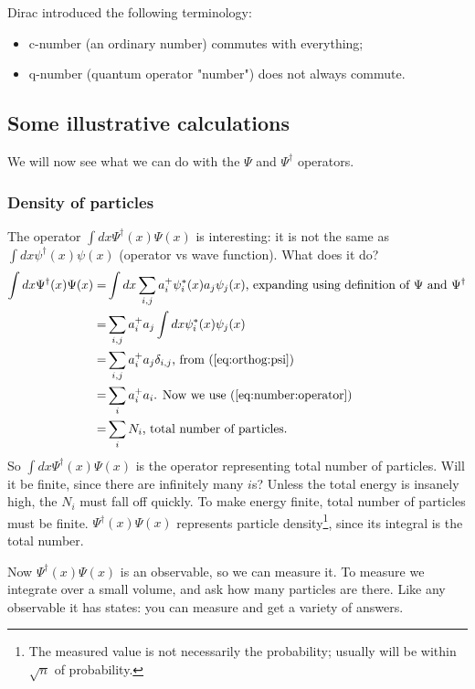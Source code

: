 \documentclass[]{article}
\begin{document}
Dirac introduced the following terminology:
\begin{itemize}
	\item c-number (an ordinary number) commutes with everything;
	\item q-number (quantum operator "number") does not always commute.
\end{itemize}

\subsection{Some illustrative calculations}
We will now see what we can do with the  $\Psi$ and  $\Psi^\dagger$ operators.

\subsubsection{Density of particles}

The operator $\int dx \Psi^\dagger(x) \Psi(x)$ is interesting: it is not the same as $\int dx \psi^\dagger(x) \psi(x)$ (operator vs wave function). What does it do?
\begin{align*}
	\int dx \Psi^\dagger(x) \Psi(x)=&\int dx \sum_{i,j}a^+_i\psi_i^*(x) a_j\psi_j(x) \text{, expanding using definition of $\Psi$ and $\Psi^\dagger$}\\
	=&\sum_{i,j} a^+_i a_j \int dx \psi_i^*(x) \psi_j(x)\\
	=&\sum_{i,j} a^+_i a_j \delta_{i,j} \text{, from (\ref{eq:orthog:psi})}\\
	=&\sum_i a^+_i a_i \text{. Now we use (\ref{eq:number:operator})}\\
	=&\sum_i N_i \text{, total number of particles.}
\end{align*}
So $\int dx \Psi^\dagger(x) \Psi(x)$ is the operator representing total number of particles. Will it be finite, since there are infinitely many $i$s? Unless the total energy is insanely high, the $N_i$ must fall off quickly. To make energy finite, total number of particles must be finite. $\Psi^\dagger(x) \Psi(x)$ represents particle density\footnote{The measured value is not necessarily the probability; usually will be within $\sqrt{n}$ of probability.}, since its integral is the total number.

Now  $\Psi^\dagger(x) \Psi(x)$ is an observable, so we can measure it.  To measure we integrate over a small volume, and ask how many particles are there. Like any observable it has states: you can measure and get a variety of answers.
\end{document}
